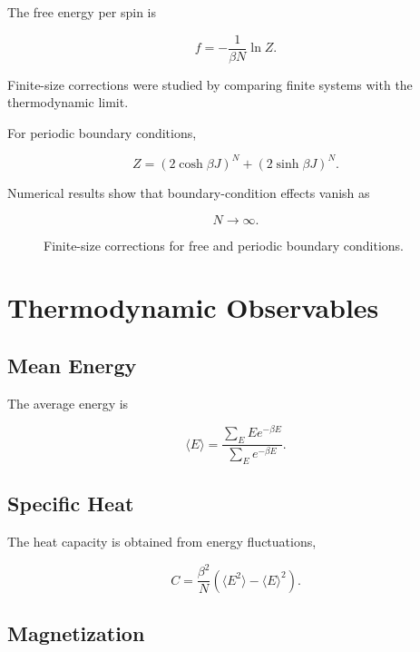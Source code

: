 \documentclass[a4paper]{article}
\begin{document}
The free energy per spin is

\begin{equation}
f = -\frac{1}{\beta N}\ln Z.
\end{equation}

Finite-size corrections were studied by comparing finite systems with the thermodynamic limit.

For periodic boundary conditions,

\begin{equation}
Z =
(2\cosh\beta J)^N
+
(2\sinh\beta J)^N.
\end{equation}

Numerical results show that boundary-condition effects vanish as

\[
N \rightarrow \infty.
\]

\begin{figure}[H]
\centering
{}
\caption{Finite-size corrections for free and periodic boundary conditions.}
\end{figure}

\section{Thermodynamic Observables}

\subsection{Mean Energy}

The average energy is

\begin{equation}
\langle E \rangle
=
\frac{
\sum_E E e^{-\beta E}
}{
\sum_E e^{-\beta E}
}.
\end{equation}

\subsection{Specific Heat}

The heat capacity is obtained from energy fluctuations,

\begin{equation}
C =
\frac{\beta^2}{N}
\left(
\langle E^2\rangle
-
\langle E\rangle^2
\right).
\end{equation}

\subsection{Magnetization}
\end{document}
